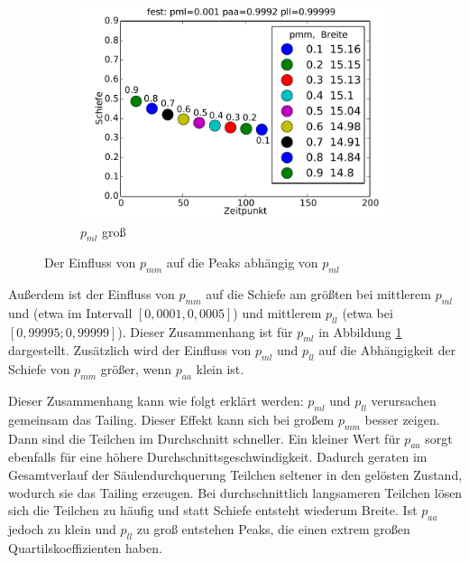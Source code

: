 \begin{figure}
\begin{subfigure}{0.6\textwidth}
\includegraphics[width=\textwidth]{bilder/pmm/3fest_p_0001_09992_099999}
\caption{$p_{ml}$ groß}
\end{subfigure}
\caption{Der Einfluss von $p_{mm}$ auf die Peaks abhängig von $p_{ml}$}
\label{einfluss_pmm_2}
\end{figure}

Außerdem ist der Einfluss von $p_{mm}$ auf die Schiefe am größten bei mittlerem $p_{ml}$ und (etwa im Intervall $[0,0001, 0,0005]$) und mittlerem $p_{ll}$ (etwa bei $[0,99995; 0,99999]$). Dieser Zusammenhang ist für $p_{ml}$ in Abbildung \ref{einfluss_pmm_2} dargestellt.
Zusätzlich wird der Einfluss von $p_{ml}$ und $p_{ll}$ auf die Abhängigkeit der Schiefe von $p_{mm}$ größer, wenn $p_{aa}$ klein ist.


Dieser Zusammenhang kann wie folgt erklärt werden: $p_{ml}$ und $p_{ll}$ verursachen gemeinsam das Tailing. Dieser Effekt kann sich bei großem $p_{mm}$ besser zeigen. Dann sind die Teilchen im Durchschnitt schneller. Ein kleiner Wert für $p_{aa}$ sorgt ebenfalls für eine höhere Durchschnittsgeschwindigkeit. Dadurch geraten im Gesamtverlauf der Säulendurchquerung Teilchen seltener in den gelösten Zustand, wodurch sie das Tailing erzeugen. Bei durchschnittlich langsameren Teilchen lösen sich die Teilchen zu häufig und statt Schiefe entsteht wiederum Breite.
Ist $p_{aa}$ jedoch zu klein und $p_{ll}$ zu groß entstehen Peaks, die einen extrem großen Quartilskoeffizienten haben. %

